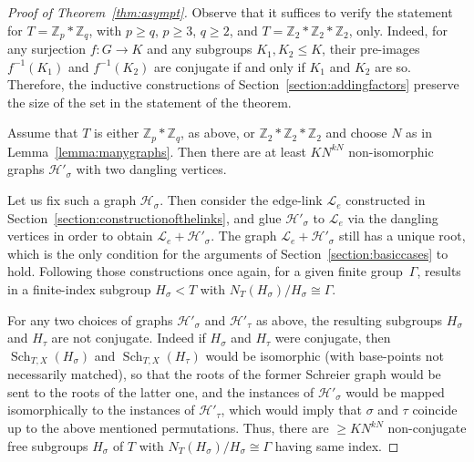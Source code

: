 \documentclass[ALCO,ThmDefs,Unicode,epreuves]{cedram}
\newcommand{\ZZ}{\mathbb{Z}}
\newcommand{\cL}{\mathcal{L}}
\newcommand{\cH}{\mathcal{H}}
\DeclareMathOperator{\Sch}{Sch}
\begin{document}
\begin{proof}[{Proof of Theorem~\ref{thm:asympt}}] 
Observe that it suffices to verify the statement for $T = \ZZ_p*\ZZ_q$, with $p\geq q$, $p \geq 3$, $q\geq 2$, and $T = \ZZ_2*\ZZ_2*\ZZ_2$, only. Indeed, for any surjection $f:G\to K$ and any subgroups $K_{1}, K_{2} \leq K$, their pre-images $f^{-1}(K_{1})$ and $f^{-1}(K_{2})$ are conjugate if and only if $K_{1}$ and $K_{2}$ are so. Therefore, the inductive constructions of Section~\ref{section:addingfactors} preserve the size of the set in the statement of the theorem. 
 
Assume that $T$ is either $\ZZ_p*\ZZ_q$, as above, or $\ZZ_2*\ZZ_2*\ZZ_2$ and choose $N$ as in Lemma~\ref{lemma:manygraphs}. Then there are at least $KN^{kN}$ non-isomorphic graphs $\cH'_{\sigma}$ with two dangling vertices.

Let us fix such a graph $\cH_{\sigma}$. Then consider the edge-link $\cL_e$ constructed in Section~\ref{section:constructionofthelinks}, and glue $\cH'_{\sigma}$ to $\cL_e$ via the dangling vertices in order to obtain $\cL_e+\cH'_{\sigma}$. The graph $\cL_e+\cH'_{\sigma}$ still has a unique root, which is the only condition for the arguments of Section~\ref{section:basiccases} to hold. Following those constructions once again, for a given finite group~${\Gamma}$, results in a finite-index subgroup $H_{\sigma} < T$ with $N_T(H_{\sigma})/H_{\sigma}\cong {\Gamma}$.


For any two choices of graphs $\cH'_{\sigma}$ and $\cH'_{\tau}$ as above, the resulting subgroups $H_{\sigma}$ and $H_{\tau}$ are not conjugate. Indeed if $H_{\sigma}$ and $H_{\tau}$ were conjugate, then $\Sch_{T,X}(H_{\sigma})$ and $\Sch_{T,X}(H_{\tau})$ would be isomorphic (with base-points not necessarily matched), so that the roots of the former Schreier graph would be sent to the roots of the latter one, and the instances of $\cH'_{\sigma}$ would be mapped isomorphically to the instances of $\cH'_{\tau}$, which would imply that $\sigma$ and $\tau$ coincide up to the above mentioned permutations. Thus, there are ${\geq}KN^{kN}$ non-conjugate free subgroups $H_\sigma$ of $T$ with $N_T(H_\sigma)/H_\sigma \cong {\Gamma}$ having same index.


\end{proof}
\end{document}
